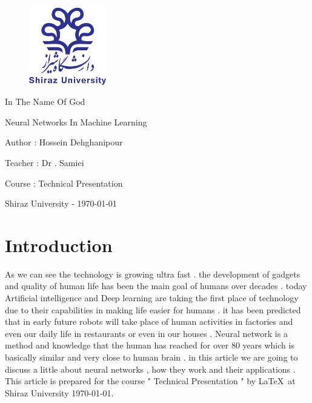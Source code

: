 \documentclass[12pt , a4paper]{article}
\title{\normalfont{Neural Networks}}
\author{Hossein Dehghanipour}
\date{\today}
\newcommand{\thedate}{\today}
\begin{document}
\thispagestyle{empty}
 \begin{center}
\begin{figure}[H]
\centering
\includegraphics[width=0.3\textwidth]{shirazuLogo.png}
\caption*{}
\label{f-0-0}
\end{figure}

{
\centering
{}  
\fontsize{16pt}{16pt}
\selectfont 
In The Name Of God
}

{
\centering
{}  
\fontsize{14pt}{14pt}
\selectfont 
Neural Networks In Machine Learning
}

{
\centering
{}  
\fontsize{12pt}{12pt}
\selectfont 
Author : Hossein Dehghanipour
}

{
\centering
{}  
\fontsize{12pt}{12pt}
\selectfont 
Teacher : Dr . Samiei
}

{
\centering
{}  
\fontsize{12pt}{12pt}
\selectfont 
Course : Technical Presentation 
}

{
\centering
{}  
\fontsize{12pt}{12pt}
\selectfont 
Shiraz University - \thedate
}

\end{center}
 

 
\setmainfont{Times New Roman}
\cleardoublepage
\tableofcontents
\thispagestyle{empty}
\cleardoublepage

\section { Introduction } 
As we can see the technology is growing ultra fast . the development of gadgets and quality of human life has been the main goal of humans over decades . today Artificial intelligence and Deep learning are taking the first place of technology due to their capabilities in making life easier for humans . it has been predicted that in early future robots will take place of human activities in factories and even our daily life in restaurants or even in our houses . Neural network is a method and knowledge that the human has reached for over 80 years which is basically similar and very close to human brain . in this article we are going to discuss a little about neural networks , how they work and their applications .
This article is prepared for the course " Technical Presentation " by   \LaTeX\   at  Shiraz  University \thedate .
\end{document}
